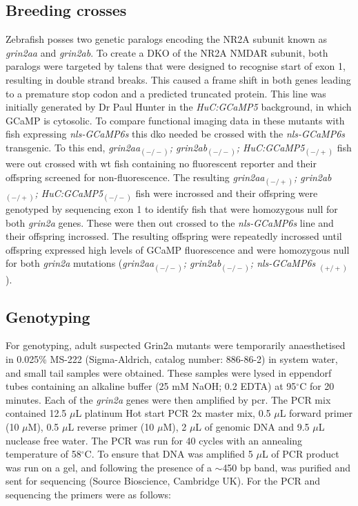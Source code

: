 \subsection{Breeding crosses}
Zebrafish posses two genetic paralogs encoding the NR2A subunit known as \textit{grin2aa} and \textit{grin2ab}. To create a DKO of the NR2A NMDAR subunit, both paralogs were targeted by \glspl{talen} that were designed to recognise start of exon 1, resulting in double strand breaks.  This caused a frame shift in both genes leading to a premature stop codon and a predicted truncated protein. This line was initially generated by Dr Paul Hunter in the \textit{HuC:GCaMP5} background, in which GCaMP is cytosolic. To compare functional imaging data in these mutants with fish expressing \emph{nls-GCaMP6s} this \gls{dko} needed be crossed with the \emph{nls-GCaMP6s} transgenic. To this end, \textit{grin2aa$_{(-/-)}$; grin2ab$_{(-/-)}$; HuC:GCaMP5$_{(-/+)}$} fish were out crossed with \gls{wt} fish containing no fluorescent reporter and their offspring screened for  non-fluorescence. The resulting \textit{grin2aa$_{(-/+)}$; grin2ab$_{(-/+)}$;  HuC:GCaMP5$_{(-/-)}$}  fish were incrossed and their offspring were genotyped by sequencing exon 1 to identify fish that were homozygous null for both \textit{grin2a} genes. These were then out crossed to the \emph{nls-GCaMP6s} line and their offspring incrossed. The resulting offspring were repeatedly incrossed until offspring expressed high levels of GCaMP fluorescence and were homozygous null for both \textit{grin2a} mutations  (\textit{grin2aa$_{(-/-)}$; grin2ab$_{(-/-)}$; nls-GCaMP6s $_{(+/+)}$}). 

\subsection{Genotyping}
For genotyping, adult suspected Grin2a mutants were temporarily anaesthetised in 0.025\% MS-222 (Sigma-Aldrich, catalog number: 886-86-2) in system water, and small tail samples were obtained. These samples were lysed in eppendorf tubes containing an alkaline buffer (25 mM NaOH; 0.2 EDTA) at 95$^{\circ}$C for 20 minutes. Each of the \textit{grin2a} genes were then amplified by \gls{pcr}. The PCR mix contained 12.5 $\mu$L platinum Hot start PCR 2x master mix, 0.5 $\mu$L forward primer (10 $\mu$M), 0.5 $\mu$L reverse primer (10  $\mu$M), 2 $\mu$L of genomic DNA and 9.5 $\mu$L nuclease free water. The PCR was run for 40 cycles with an annealing temperature of 58$^{\circ}$C. To ensure that DNA was amplified 5 $\mu$L of PCR product was run on a gel, and following the presence of a $\sim$450 bp band, was purified and sent for sequencing (Source Bioscience, Cambridge UK). For the PCR and sequencing the primers were as follows:



